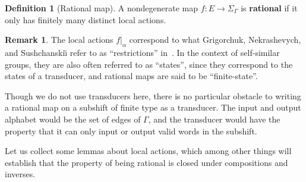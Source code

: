 \documentclass[11pt,letterpaper]{amsart}
\theoremstyle{definition}
\newtheorem{definition}[theorem]{Definition}
\newtheorem{remark}[theorem]{Remark}
\newcommand{\newword}[1]{\textbf{#1}}
\begin{document}
\begin{definition}[Rational map]
A nondegenerate map $f\colon E\to \Sigma_\Gamma$ is \newword{rational} if it only has finitely many distinct local actions.
\end{definition}

\begin{remark}
The local actions $f|_\alpha$ correspond to what Grigorchuk, Nekrashevych, and Sushchanski\u{\i} refer to as ``restrictions'' in~\cite{GNS}.  In the context of self-similar groups, they are also often referred to as ``states'', since they correspond to the states of a transducer, and rational maps are said to be ``finite-state''.

Though we do not use transducers here, there is no particular obstacle to writing a rational map on a subshift of finite type as a transducer.  The input and output alphabet would be the set of edges of $\Gamma$, and the transducer would have the property that it can only input or output valid words in the subshift.
\end{remark}

Let us collect some lemmas about local actions, which among other things will establish that the property of being rational is closed under compositions and inverses.
\end{document}
